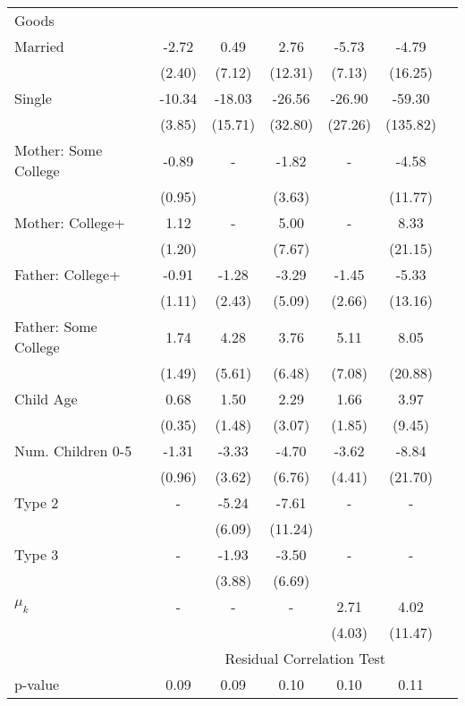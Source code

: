 \begin{tabular}{lcccccc}
Goods}\\\cmidrule(r){2-7}Married&-2.72&0.49&2.76&-5.73&-4.79&\\&(2.40)&(7.12)&(12.31)&(7.13)&(16.25)&\\Single&-10.34&-18.03&-26.56&-26.90&-59.30&\\&(3.85)&(15.71)&(32.80)&(27.26)&(135.82)&\\Mother: Some College&-0.89&-&-1.82&-&-4.58&\\&(0.95)&&(3.63)&&(11.77)&\\Mother: College+&1.12&-&5.00&-&8.33&\\&(1.20)&&(7.67)&&(21.15)&\\Father: College+&-0.91&-1.28&-3.29&-1.45&-5.33&\\&(1.11)&(2.43)&(5.09)&(2.66)&(13.16)&\\Father: Some College&1.74&4.28&3.76&5.11&8.05&\\&(1.49)&(5.61)&(6.48)&(7.08)&(20.88)&\\Child Age&0.68&1.50&2.29&1.66&3.97&\\&(0.35)&(1.48)&(3.07)&(1.85)&(9.45)&\\Num. Children 0-5&-1.31&-3.33&-4.70&-3.62&-8.84&\\&(0.96)&(3.62)&(6.76)&(4.41)&(21.70)&\\Type 2&-&-5.24&-7.61&-&-&\\&&(6.09)&(11.24)&&&\\Type 3&-&-1.93&-3.50&-&-&\\&&(3.88)&(6.69)&&&\\$\mu_{k}$&-&-&-&2.71&4.02&\\&&&&(4.03)&(11.47)&\\& \multicolumn{6}{c}{Residual Correlation Test}\\\cmidrule(r){2-7}p-value&0.09&0.09&0.10&0.10&0.11&\\
\bottomrule\end{tabular}